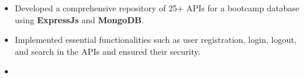 \documentclass[10pt,a4paper,ragged2e,withhyper]{altacv}
\begin{document}
\begin{paracol}{2}
\begin{itemize}
\item Developed a comprehensive repository of 25+ APIs for a bootcamp database using \textbf{\color{accent!90!black}ExpressJs} and \textbf{\color{accent!90!black}MongoDB}.
\item Implemented essential functionalities such as user registration, login, logout, and search in the APIs and ensured their security.
\item {}
\end{itemize}




\end{paracol}
\end{document}
